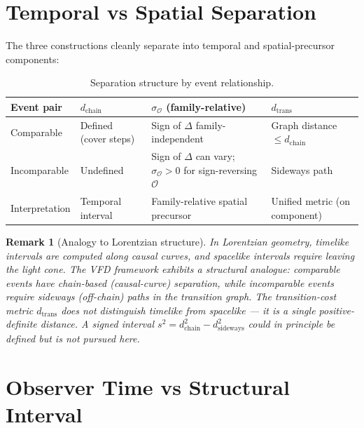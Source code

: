\documentclass[12pt]{article}
\newtheorem{remark}[theorem]{Remark}
\newcommand{\Ocal}{\mathcal{O}}
\begin{document}
\section{Temporal vs Spatial Separation}\label{sec:split}

The three constructions cleanly separate into temporal and spatial-precursor components:

\begin{table}[ht]
\centering
\caption{Separation structure by event relationship.}
\label{tab:separation}
\begin{tabular}{@{}llll@{}}
\toprule
Event pair & $d_{\mathrm{chain}}$ & $\sigma_{\Ocal}$ (family-relative) & $d_{\mathrm{trans}}$ \\
\midrule
Comparable & Defined (cover steps) & Sign of $\Delta$ family-independent & Graph distance $\leq d_{\mathrm{chain}}$ \\
Incomparable & Undefined & Sign of $\Delta$ can vary; $\sigma_{\Ocal}>0$ for sign-reversing $\Ocal$ & Sideways path \\
\midrule
Interpretation & Temporal interval & Family-relative spatial precursor & Unified metric (on component) \\
\bottomrule
\end{tabular}
\end{table}

\begin{remark}[Analogy to Lorentzian structure]
In Lorentzian geometry, timelike intervals are computed along causal curves, and spacelike intervals require leaving the light cone. The VFD framework exhibits a structural analogue: comparable events have chain-based (causal-curve) separation, while incomparable events require sideways (off-chain) paths in the transition graph. The transition-cost metric $d_{\mathrm{trans}}$ does not distinguish timelike from spacelike --- it is a single positive-definite distance. A signed interval $s^2 = d_{\mathrm{chain}}^2 - d_{\mathrm{sideways}}^2$ could in principle be defined but is not pursued here.
\end{remark}

\section{Observer Time vs Structural Interval}\label{sec:comparison}
\end{document}
